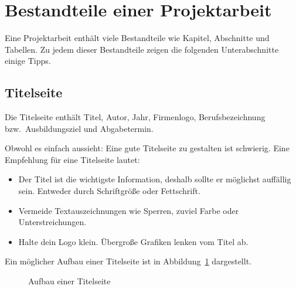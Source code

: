 \documentclass[a4paper,titlepage=true,twoside]{scrartcl}
\begin{document}
\section{Bestandteile einer Projektarbeit}
Eine Projektarbeit enthält viele Bestandteile wie Kapitel, Abschnitte und Tabellen.
Zu jedem dieser Bestandteile zeigen die folgenden Unterabschnitte einige Tipps.

\subsection{Titelseite}
Die Titelseite enthält Titel, Autor, Jahr, Firmenlogo, Berufsbezeichnung
bzw.\ Ausbildungsziel und Abgabetermin.

Obwohl es einfach aussieht: Eine gute Titelseite zu gestalten ist schwierig.
Eine Empfehlung für eine Titelseite lautet:

\begin{itemize}
 \item Der Titel ist die wichtigste Information, deshalb sollte er möglichst auffällig sein.
  Entweder durch Schriftgröße oder Fettschrift.
 \item Vermeide Textauszeichnungen wie Sperren, zuviel Farbe oder Unterstreichungen.
 \item Halte dein Logo klein. Übergroße Grafiken lenken vom Titel ab.
\end{itemize}

Ein möglicher Aufbau einer Titelseite ist in Abbildung~\ref{fig.titleseite}
dargestellt.

\begin{figure}[tb]
 \caption{Aufbau einer Titelseite\label{fig.titleseite}}
\end{figure}
\end{document}
